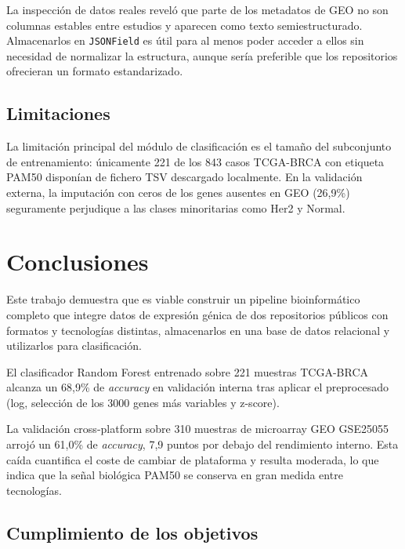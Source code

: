 \documentclass[12pt, a4paper]{report}
\begin{document}
La inspección de datos reales reveló que parte de los metadatos de GEO no son columnas estables entre estudios y aparecen como texto semiestructurado. Almacenarlos en \texttt{JSONField} es útil para al menos poder acceder a ellos sin necesidad de normalizar la estructura, aunque sería preferible que los repositorios ofrecieran un formato estandarizado.

\section{Limitaciones}

La limitación principal del módulo de clasificación es el tamaño del subconjunto de entrenamiento: únicamente 221 de los 843 casos TCGA-BRCA con etiqueta PAM50 disponían de fichero TSV descargado localmente. En la validación externa, la imputación con ceros de los genes ausentes en GEO (26,9\%) seguramente perjudique a las clases minoritarias como Her2 y Normal.




\chapter{Conclusiones}

Este trabajo demuestra que es viable construir un pipeline bioinformático completo que integre datos de expresión génica de dos repositorios públicos con formatos y tecnologías distintas, almacenarlos en una base de datos relacional y utilizarlos para clasificación.

El clasificador Random Forest entrenado sobre 221 muestras TCGA-BRCA alcanza un 68,9\% de \textit{accuracy} en validación interna tras aplicar el preprocesado (log, selección de los 3000 genes más variables y z-score).

La validación cross-platform sobre 310 muestras de microarray GEO GSE25055 arrojó un 61,0\% de \textit{accuracy}, 7,9 puntos por debajo del rendimiento interno. Esta caída cuantifica el coste de cambiar de plataforma y resulta moderada, lo que indica que la señal biológica PAM50 se conserva en gran medida entre tecnologías.

\section{Cumplimiento de los objetivos}
\end{document}

